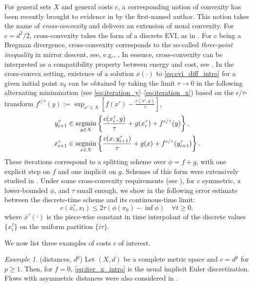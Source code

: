 \documentclass[reqno]{amsart}
\newcounter{results}[section]
\theoremstyle{plain}
\theoremstyle{remark}
\newtheorem{example}[results]{Example}
\theoremstyle{plain}
\numberwithin{equation}{section}
\theoremstyle{remark}
\newcommand{\argmin}{\mathop{\rm argmin}\limits}
\begin{document}
For general sets $X$ and  general  costs $c$,  a corresponding notion of convexity has been recently brought to evidence in \cite{leger2023gradient} by the first-named author. This notion takes the name of {\it cross-convexity} and delivers an extension of  usual convexity. For $c={d^2}/{2}$,  cross-convexity  takes the form of a discrete EVI, as in  \cite[Corollary 4.1.3]{ags08}. For $c$  being  a Bregman divergence, cross-convexity corresponds to the so-called   {\it three-point inequality} in mirror descent, see, e.g., \cite[Lemma 3.2]{chen1993convergence}.  In essence, cross-convexity  can be interpreted as a compatibility property between energy and cost,  see .  In the cross-convex setting,  existence of a solution $x(\cdot)$ to \eqref{eq:evi_diff_intro} for a given initial point $x_0$  can be  obtained  by  taking the limit $\tau\to 0$ in the following alternating minimization (see \eqref{eq:iteration_y}--\eqref{eq:iteration_x}) based on the $c/\tau$-transform $f^{c/\tau}(y):=\sup_{x'\in X}[f(x')-\frac{c(x',y)}{\tau}]$, 
\begin{align}
	y_{i+1}^{\tau}&\in \argmin_{y \in X} \left\{ \frac{c(x_{i}^{\tau},y)}{\tau}+g(x_{i}^{\tau}) + f^{c/\tau}(y)\right\}, \label{eq:iter_y_intro} \\
	x_{i+1}^{\tau}&\in\argmin_{x \in X} \left\{ \frac{c(x,y_{i+1}^{\tau})}{\tau} +g(x)+ f^{c/\tau}(y_{i+1}^{\tau})\right\}.\label{eq:iter_x_intro}
\end{align}
 These iterations correspond to  a splitting scheme over $\phi=f+g$, with one explicit step on $f$ and one implicit on $g$. Schemes of this form were extensively studied in \cite{leger2023gradient}. Under some cross-convexity requirements  (see  ), for $c$ symmetric,  a  lower-bounded $\phi$, and $\tau$ small enough, we show in  the following error estimate between the discrete-time scheme and its continuous-time limit:
\begin{equation}\label{eq:error_estimate_intro}
	c \left (\bar{x}^{\tau}_t, x_t \right ) \le 2\tau (\phi(x_0)-\inf \phi) \quad \forall t \ge 0,
\end{equation}
 where $\bar{x}^{\tau}(\cdot)$ is the piece-wise constant in time interpolant of the discrete values $\{x^\tau_i\}$ on the uniform partition $\{i\tau\}$. 

We now list three examples of costs $c$ of interest.





\begin{example}(distances, $d^p$)
	\label{ex:distance}  Let $(X,d)$ be a complete metric space and $c=d^p$ for $p\ge 1$. Then, for $f=0$, \eqref{eq:iter_x_intro} is the usual implicit Euler discretization.  Flows with asymmetric distances were also considered in \cite{Rossi2009,Chenchiah2009,Ohta2023}.
\end{example}
\end{document}
